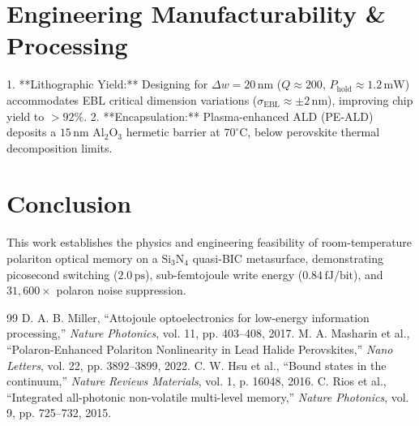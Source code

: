 \documentclass[10pt, conference]{IEEEtran}
\begin{document}
\section{Engineering Manufacturability \& Processing}

1. **Lithographic Yield:** Designing for $\Delta w = 20\,\text{nm}$ ($Q \approx 200$, $P_{\text{hold}} \approx 1.2\,\text{mW}$) accommodates EBL critical dimension variations ($\sigma_{\text{EBL}} \approx \pm 2\,\text{nm}$), improving chip yield to $>92\%$.
2. **Encapsulation:** Plasma-enhanced ALD (PE-ALD) deposits a $15\,\text{nm}$ $\text{Al}_2\text{O}_3$ hermetic barrier at $70^\circ\text{C}$, below perovskite thermal decomposition limits.

\section{Conclusion}

This work establishes the physics and engineering feasibility of room-temperature polariton optical memory on a $\text{Si}_3\text{N}_4$ quasi-BIC metasurface, demonstrating picosecond switching ($2.0\,\text{ps}$), sub-femtojoule write energy ($0.84\,\text{fJ/bit}$), and $31{,}600\times$ polaron noise suppression.

\begin{thebibliography}{99}
 D. A. B. Miller, ``Attojoule optoelectronics for low-energy information processing,'' \textit{Nature Photonics}, vol. 11, pp. 403--408, 2017.
 M. A. Masharin et al., ``Polaron-Enhanced Polariton Nonlinearity in Lead Halide Perovskites,'' \textit{Nano Letters}, vol. 22, pp. 3892--3899, 2022.
 C. W. Hsu et al., ``Bound states in the continuum,'' \textit{Nature Reviews Materials}, vol. 1, p. 16048, 2016.
 C. Rios et al., ``Integrated all-photonic non-volatile multi-level memory,'' \textit{Nature Photonics}, vol. 9, pp. 725--732, 2015.
\end{thebibliography}
\end{document}
